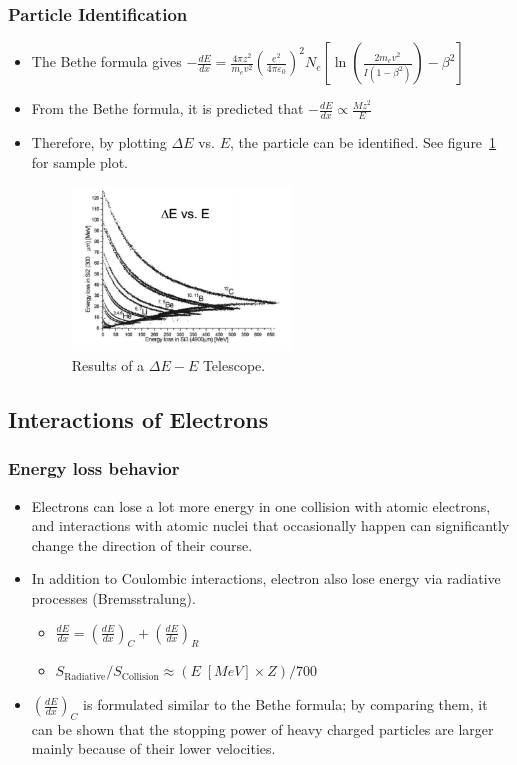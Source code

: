 \subsubsection{Particle Identification}
\begin{itemize}
    \item The Bethe formula gives $-\frac{dE}{dx}=\frac{4\pi z^2}{m_ev^2}\left(\frac{e^2}{4\pi\varepsilon_0}\right)^2N_e\left[\ln\left(\frac{2m_ev^2}{I(1-\beta^2)}\right)-\beta^2\right]$
    \item From the Bethe formula, it is predicted that $-\frac{dE}{dx}\propto \frac{Mz^2}{E}$
    \item Therefore, by plotting $\Delta E$ vs. $E$, the particle can be identified. See figure~\ref{fig:DeltaE_E_telescope} for sample plot.
    \begin{figure}
        \centering
        \includegraphics[width=0.55\textwidth]{images/DeltaE_E_telescope.png}
        \caption{Results of a $\Delta E-E$ Telescope.}
        \label{fig:DeltaE_E_telescope}
    \end{figure}
\end{itemize}

\subsection{Interactions of Electrons}
\subsubsection{Energy loss behavior}
\begin{itemize}
    \item Electrons can lose a lot more energy in one collision with atomic electrons, and interactions with atomic nuclei that occasionally happen can significantly change the direction of their course. 
    \item In addition to Coulombic interactions, electron also lose energy via radiative processes (Bremsstralung).
    \begin{itemize}
        \item[] $\frac{dE}{dx}=\left(\frac{dE}{dx}\right)_C+\left(\frac{dE}{dx}\right)_R$
        \item[] $S_\text{Radiative}/S_\text{Collision}\approx 
    (E\;[MeV]\times Z)/700$
    \end{itemize}
    \item $\left(\frac{dE}{dx}\right)_C$ is formulated similar to the Bethe formula; by comparing them, it can be shown that the stopping power of heavy charged particles are larger mainly because of their lower velocities. 
\end{itemize}
